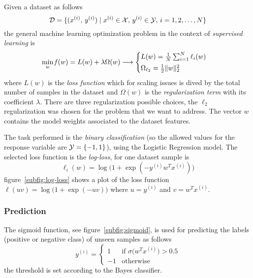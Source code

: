 Given a dataset as follows
\[
\mathcal{D}=\{(x^{(i)},\,y^{(i)})\mid x^{(i)}\in\mathcal{X},\,y^{(i)}\in\mathcal{Y},\,i=1,2,\dots,N\}
\]
the general machine learning optimization problem in the context of \emph{supervised learning} is
\[
\min_{w}\operatorname*{\mathit{f}}(w)=L(w)+\lambda\Omega(w)\longrightarrow
\begin{cases}
L(w)=\frac{1}{N}\sum_{i=1}^N\ell_i(w) \\[0.5ex]
\Omega_{\ell_2}=\frac{1}{2}\lVert w\rVert_2^2
\end{cases}
\]
where $L(w)$ is the \emph{loss function} which for scaling issues is dived by the total number of samples in the dataset and $\Omega(w)$ is the \emph{regularization term} with its coefficient $\lambda$. There are three regularization possible choices, the $\ell_2$ regularization was chosen for the problem that we want to address. The vector $w$ contains the model weights associated to the dataset features.

The task performed is the \emph{binary classification} (so the allowed values for the response variable are $\mathcal{Y}=\{-1,1\}$), using the Logistic Regression model. The selected loss function is the \emph{log-loss}, for one dataset sample is
\begin{equation}\label{eq:sample_loss}
\ell_i(w)=\log\bigl(1+\exp(-y^{(i)}w^Tx^{(i)})\bigr)
\end{equation}
figure~\vref{subfig:log-loss} shows a plot of the loss function $\ell(uv)=\log\bigl(1+\exp(-uv)\bigr)$ where $u=y^{(i)}$ and $v=w^Tx^{(i)}$.

\subsubsection*{Prediction}

The sigmoid function, see figure~\vref{subfig:sigmoid}, is used for predicting the labels (positive or negative class) of unseen samples as follows
\[
y^{(i)}=
\begin{cases}
1  & \text{if $\sigma\bigl(w^Tx^{(i)}\bigr)>0.5$} \\
-1 & \text{otherwise}
\end{cases}
\]
the threshold is set according to the Bayes classifier.

